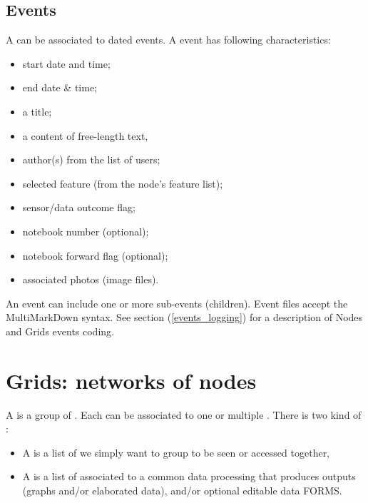 \subsection{Events}
\label{eventnode}

A  can be associated to dated events. A  event has following characteristics:
\begin{itemize}
	\item start date and time;
	\item end date \& time;
	\item a title;
	\item a content of free-length text,
	\item author(s) from the list of \webobs users;
	\item selected feature (from the node's feature list);
	\item sensor/data outcome flag;
	\item notebook number (optional);
	\item notebook forward flag (optional);
	\item associated photos (image files).
\end{itemize}
An event can include one or more sub-events (children). Event files  accept the MultiMarkDown syntax. See  section (\ref{events_logging}) for a description of Nodes and Grids events coding.


\section{Grids: networks of nodes}
\label{grids}

A  is a group of . Each  can be associated to one or multiple . There is two kind of :

\begin{itemize}
\item    A  is a list of  we simply want to group to be seen or accessed together,
\item    A  is a list of  associated to a common data processing that produces outputs (graphs and/or elaborated data), and/or optional editable data FORMS.
\end{itemize}

